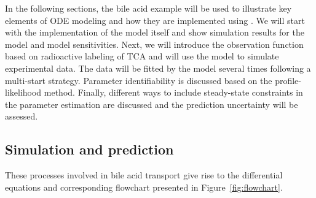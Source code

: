 \documentclass[article]{jss}
\begin{document}
In the following sections, the bile acid example will be used to illustrate key elements of ODE modeling and how they are implemented using . We will start with the implementation of the model itself and show simulation results for the model and model sensitivities. Next, we will introduce the observation function based on radioactive labeling of TCA and will use the model to simulate experimental data. The data will be fitted by the model several times following a multi-start strategy. Parameter identifiability is discussed based on the profile-likelihood method. Finally, different ways to include steady-state constraints in the parameter estimation are discussed and the prediction uncertainty will be assessed.


\subsection{Simulation and prediction}
These processes involved in bile acid transport give rise to the differential equations and corresponding flowchart presented in Figure~\ref{fig:flowchart}. 
\end{document}
